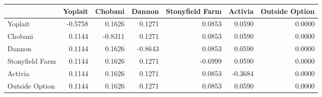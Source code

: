\begin{tabular}{lrrrrrr}
\toprule
 & Yoplait & Chobani & Dannon & Stonyfield Farm & Activia & Outside Option \\
\midrule
Yoplait & -0.5758 & 0.1626 & 0.1271 & 0.0853 & 0.0590 & 0.0000 \\
Chobani & 0.1144 & -0.8311 & 0.1271 & 0.0853 & 0.0590 & 0.0000 \\
Dannon & 0.1144 & 0.1626 & -0.8643 & 0.0853 & 0.0590 & 0.0000 \\
Stonyfield Farm & 0.1144 & 0.1626 & 0.1271 & -0.6999 & 0.0590 & 0.0000 \\
Activia & 0.1144 & 0.1626 & 0.1271 & 0.0853 & -0.3684 & 0.0000 \\
Outside Option & 0.1144 & 0.1626 & 0.1271 & 0.0853 & 0.0590 & 0.0000 \\
\bottomrule
\end{tabular}